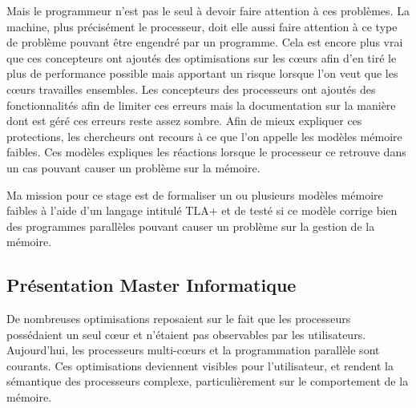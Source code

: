 \documentclass[12pt,a4paper]{article}
\begin{document}
Mais le programmeur n'est pas le seul à devoir faire attention à ces problèmes. La machine, plus précisément le processeur, doit elle aussi faire attention à ce type de problème pouvant être engendré par un programme. Cela est encore plus vrai que ces concepteurs ont ajoutés des optimisations sur les cœurs afin d'en tiré le plus de performance possible mais apportant un risque lorsque l'on veut que les cœurs travailles ensembles. Les concepteurs des processeurs ont ajoutés des fonctionnalités afin de limiter ces erreurs mais la documentation sur la manière dont est géré ces erreurs reste assez sombre.
Afin de mieux expliquer ces protections, les chercheurs ont recours à ce que l'on appelle les modèles mémoire faibles. Ces modèles expliques les réactions lorsque le processeur ce retrouve dans un cas pouvant causer un problème sur la mémoire.

Ma mission pour ce stage est de formaliser un ou plusieurs modèles mémoire faibles à l'aide d'un langage intitulé TLA+ et de testé si ce modèle corrige bien des programmes parallèles pouvant causer un problème sur la gestion de la mémoire.      
  
\subsection{Présentation Master Informatique}

De nombreuses optimisations reposaient sur le fait que les processeurs possédaient un seul cœur et n'étaient pas observables par les utilisateurs.
Aujourd'hui, les processeurs multi-cœurs et la programmation parallèle sont courants. Ces optimisations deviennent visibles pour l'utilisateur, et rendent la sémantique des processeurs complexe, particulièrement sur le comportement de la mémoire.
\end{document}
